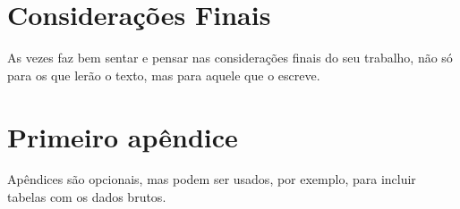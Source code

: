 \documentclass[twoside,a4paper,11pt]{report}
\begin{document}
\chapter{Considerações Finais}

As vezes faz bem sentar e pensar nas considerações finais do seu trabalho, não só para os que lerão o texto, mas para aquele que o escreve.





\appendix

\chapter{Primeiro apêndice}\label{ap2}

Apêndices são opcionais, mas podem ser usados, por exemplo, para incluir tabelas com os dados brutos.

\end{document}
